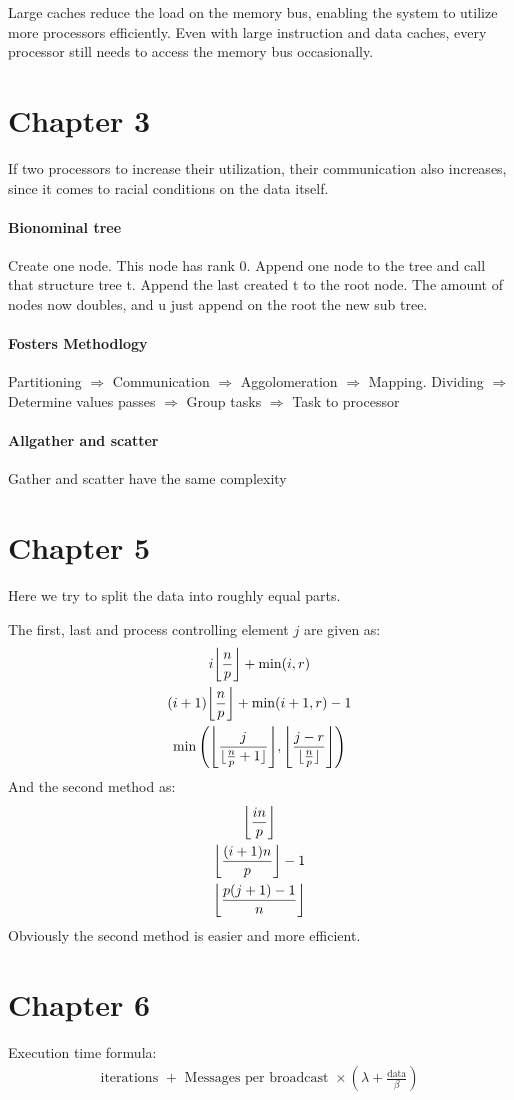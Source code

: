 Large caches reduce the load on the memory bus, enabling the system to utilize more processors efficiently. Even with large instruction and data caches, every processor still needs to access the memory bus occasionally.

\section{Chapter 3}
If two processors to increase their utilization, their communication also increases, since it comes to racial conditions on the data itself.

\paragraph{Bionominal tree}
Create one node. This node has rank 0. Append one node to the tree and call that structure tree t. Append the last created t to the root node. The amount of nodes now doubles, and u just append on the root the new sub tree.

\paragraph{Fosters Methodlogy}
Partitioning $\Rightarrow$ Communication $\Rightarrow$ Aggolomeration $\Rightarrow$ Mapping.
 Dividing   $\Rightarrow$   Determine values passes   $\Rightarrow$  Group tasks  $\Rightarrow$  Task to processor

\paragraph{Allgather and scatter}
Gather and scatter have the same complexity

\section{Chapter 5}

Here we try to split the data into roughly equal parts.

The first, last and process controlling element $j$ are given as:
\begin{gather*}
i \floor*{\frac{n}{p}} + \min( i,r)\\
(i+1) \floor*{\frac{n}{p}} + \min( i+1,r)-1\\
\min\left( \floor*{\frac{j}{\floor{\frac{n}{p}+1}} }, \floor*{ \frac{j-r}{\floor{\frac{n}{p}}}} \right)
\end{gather*}
And the second method as:
\begin{gather*}
\floor*{\frac{in }{p}}\\
\floor*{\frac{(i+1)n}{p}} -1\\
\floor*{\frac{p(j+1)-1}{n}}
\end{gather*}
Obviously the second method is easier and more efficient.

\section{Chapter 6}

Execution time formula:
\begin{gather*}
\text{iterations } + \text{ Messages per broadcast } \times \left( \lambda  + \frac{\text{data}}{\beta} \right)
\end{gather*}